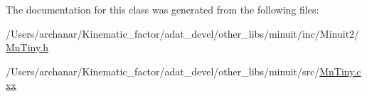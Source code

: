 The documentation for this class was generated from the following files\+:\begin{DoxyCompactItemize}
\item 
/\+Users/archanar/\+Kinematic\+\_\+factor/adat\+\_\+devel/other\+\_\+libs/minuit/inc/\+Minuit2/\mbox{\hyperlink{other__libs_2minuit_2inc_2Minuit2_2MnTiny_8h}{Mn\+Tiny.\+h}}\item 
/\+Users/archanar/\+Kinematic\+\_\+factor/adat\+\_\+devel/other\+\_\+libs/minuit/src/\mbox{\hyperlink{MnTiny_8cxx}{Mn\+Tiny.\+cxx}}\end{DoxyCompactItemize}
